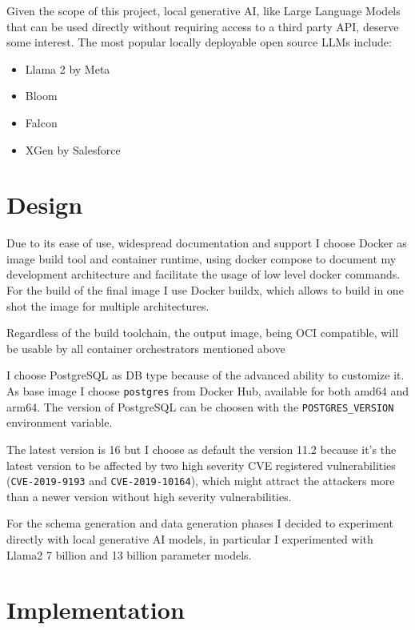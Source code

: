 \documentclass[12pt, letterpaper, twoside]{article}
\begin{document}
Given the scope of this project, local generative AI, like Large Language Models that can be used directly without requiring access to a third party API, deserve some interest. The most popular locally deployable open source LLMs include:
\begin{itemize}
    \item Llama 2 by Meta
    \item Bloom
    \item Falcon
    \item XGen by Salesforce
\end{itemize}

\section{Design}
\label{sec:design}

Due to its ease of use, widespread documentation and support I choose Docker as image build tool and container runtime, using docker compose to document my development architecture and facilitate the usage of low level docker commands. For the build of the final image I use Docker buildx, which allows to build in one shot the image for multiple architectures.

Regardless of the build toolchain, the output image, being OCI compatible, will be usable by all container orchestrators mentioned above

I choose PostgreSQL as DB type because of the advanced ability to customize it.
As base image I choose \verb|postgres| from Docker Hub, available for both amd64 and arm64.
The version of PostgreSQL can be choosen with the \verb|POSTGRES_VERSION| environment variable.

The latest version is 16 but I choose as default the version 11.2 because it's the latest version to be affected by two high severity CVE registered vulnerabilities (\verb|CVE-2019-9193| and \verb|CVE-2019-10164|), which might attract the attackers more than a newer version without high severity vulnerabilities.

For the schema generation and data generation phases I decided to experiment directly with local generative AI models, in particular I experimented with Llama2 7 billion and 13 billion parameter models.

\section{Implementation}
\label{sec:implementation}
\end{document}
